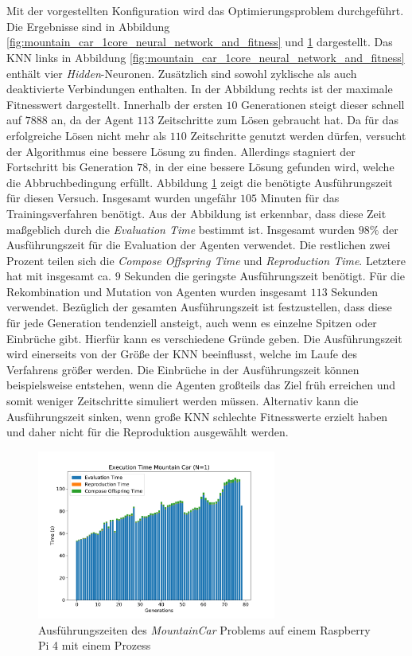 \\\\
Mit der vorgestellten Konfiguration wird das Optimierungsproblem durchgeführt. Die Ergebnisse sind in Abbildung \ref{fig:mountain_car_1core_neural_network_and_fitness} und \ref{fig:mountain_car_time_single_core} dargestellt. Das \ac{KNN} links in Abbildung \ref{fig:mountain_car_1core_neural_network_and_fitness} enthält vier \emph{Hidden}-Neuronen. Zusätzlich sind sowohl zyklische als auch deaktivierte Verbindungen enthalten. In der Abbildung rechts ist der maximale Fitnesswert dargestellt. Innerhalb der ersten $10$ Generationen steigt dieser schnell auf $7888$ an, da der Agent $113$ Zeitschritte zum Lösen gebraucht hat. Da für das erfolgreiche Lösen nicht mehr als $110$ Zeitschritte genutzt werden dürfen, versucht der Algorithmus eine bessere Lösung zu finden. Allerdings stagniert der Fortschritt bis Generation $78$, in der eine bessere Lösung gefunden wird, welche die Abbruchbedingung erfüllt. Abbildung \ref{fig:mountain_car_time_single_core} zeigt die benötigte Ausführungszeit für diesen Versuch. Insgesamt wurden ungefähr $105$ Minuten für das Trainingsverfahren benötigt. Aus der Abbildung ist erkennbar, dass diese Zeit maßgeblich durch die \emph{Evaluation Time} bestimmt ist. Insgesamt wurden $98\%$ der Ausführungszeit für die Evaluation der Agenten verwendet. Die restlichen zwei Prozent teilen sich die \emph{Compose Offspring Time} und \emph{Reproduction Time}. Letztere hat mit insgesamt ca. $9$ Sekunden die geringste Ausführungszeit benötigt. Für die Rekombination und Mutation von Agenten wurden insgesamt $113$ Sekunden verwendet. Bezüglich der gesamten Ausführungszeit ist festzustellen, dass diese für jede Generation tendenziell ansteigt, auch wenn es einzelne Spitzen oder Einbrüche gibt. Hierfür kann es verschiedene Gründe geben. Die Ausführungszeit wird einerseits von der Größe der \ac{KNN} beeinflusst, welche im Laufe des Verfahrens größer werden. Die Einbrüche in der Ausführungszeit können beispielsweise entstehen, wenn die Agenten großteils das Ziel früh erreichen und somit weniger Zeitschritte simuliert werden müssen. Alternativ kann die Ausführungszeit sinken, wenn große \ac{KNN} schlechte Fitnesswerte erzielt haben und daher nicht für die Reproduktion ausgewählt werden.  
\begin{figure}[!h]
	\centering
	\includegraphics[width=0.7\textwidth]{./img/mountain_car_single/1413_time_1core_1pi.pdf} 
	\caption{Ausführungszeiten des \emph{MountainCar} Problems auf einem Raspberry Pi 4 mit einem Prozess}
	\label{fig:mountain_car_time_single_core}
\end{figure}

